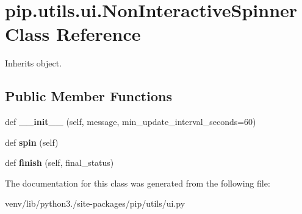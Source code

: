 \hypertarget{classpip_1_1utils_1_1ui_1_1_non_interactive_spinner}{}\section{pip.\+utils.\+ui.\+Non\+Interactive\+Spinner Class Reference}
\label{classpip_1_1utils_1_1ui_1_1_non_interactive_spinner}


Inherits object.

\subsection*{Public Member Functions}
\begin{DoxyCompactItemize}
\item 
\mbox{\label{classpip_1_1utils_1_1ui_1_1_non_interactive_spinner_a54b02297c32161ba2b7ee45fee355aff}} 
def {\bfseries \+\_\+\+\_\+init\+\_\+\+\_\+} (self, message, min\+\_\+update\+\_\+interval\+\_\+seconds=60)
\item 
\mbox{\label{classpip_1_1utils_1_1ui_1_1_non_interactive_spinner_ab4cf1c570153d6c593346793f74ff26b}} 
def {\bfseries spin} (self)
\item 
\mbox{\label{classpip_1_1utils_1_1ui_1_1_non_interactive_spinner_aa9f1042291224cf21ecd3ee4587f30fa}} 
def {\bfseries finish} (self, final\+\_\+status)
\end{DoxyCompactItemize}


The documentation for this class was generated from the following file\+:\begin{DoxyCompactItemize}
\item 
venv/lib/python3./site-\/packages/pip/utils/ui.\+py\end{DoxyCompactItemize}
